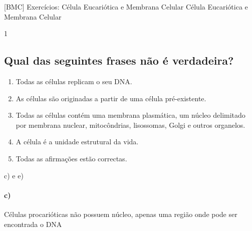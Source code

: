 \documentclass[\mainfilename]{subfiles}
\date{\Large 16 de Setembro de 2022}
\begin{document}
[BMC]
{Exercícios: Célula Eucariótica e Membrana Celular}
{Célula Eucariótica e Membrana Celular}

\begin{questionBox}1{} %
    
    \subsection*{Qual das seguintes frases não é verdadeira?}

    \begin{enumerate}[label=\alph{enumi})]
        \item Todas as células replicam o seu DNA.
        \item As células são originadas a partir de uma célula pré-existente.
        \item Todas as células contém uma membrana plasmática, um núcleo delimitado por membrana nuclear, mitocôndrias, lisossomas, Golgi e outros organelos.
        \item A célula é a unidade estrutural da vida. 
        \item Todas as afirmações estão correctas.
    \end{enumerate}

    \begin{answerBox}{} %
        c) e e)

        \paragraph*{c)} Células procarióticas não possuem núcleo, apenas uma região onde pode ser encontrada o DNA
    \end{answerBox}

    
\end{questionBox}
\end{document}
